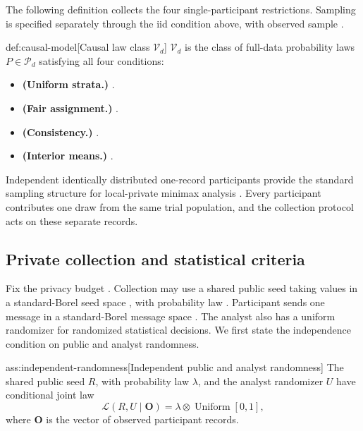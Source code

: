 The following definition collects the four single-participant restrictions. Sampling is specified separately through the iid condition above, with observed sample .

\begin{definitionv}{def:causal-model}[Causal law class $\mathcal V_d$]
\(\mathcal V_d\) is the class of full-data probability laws \(P\in\mathcal P_d\) satisfying all four conditions:
\begin{itemize}
\item \textbf{(Uniform strata.)} .
\item \textbf{(Fair assignment.)} .
\item \textbf{(Consistency.)} .
\item \textbf{(Interior means.)} .
\end{itemize}
\end{definitionv}

Independent identically distributed one-record participants provide the standard sampling structure for local-private minimax analysis \citep{DuchiJordanWainwright2018Minimax}. Every participant contributes one draw from the same trial population, and the collection protocol acts on these separate records.

\subsection{Private collection and statistical criteria}

Fix the privacy budget . Collection may use a shared public seed  taking values in a standard-Borel seed space , with probability law . Participant  sends one message in a standard-Borel message space . The analyst also has a uniform randomizer  for randomized statistical decisions. We first state the independence condition on public and analyst randomness.

\begin{assumptionv}{ass:independent-randomness}[Independent public and analyst randomness]
The shared public seed \(R\), with probability law \(\lambda\), and the analyst randomizer \(U\) have conditional joint law
\[
\mathcal L(R,U\mid\mathbf O)
=\lambda\otimes\operatorname{Uniform}[0,1],
\]
where \(\mathbf O\) is the vector of observed participant records.
\end{assumptionv}

